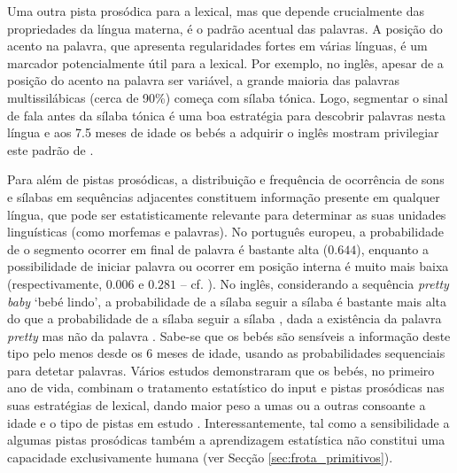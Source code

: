 \documentclass[output=paper]{LSP/langsci}
\begin{document}
Uma outra pista prosódica para a  lexical, mas que depende crucialmente das propriedades da língua materna, é o padrão acentual das palavras. A posição do acento na palavra, que apresenta regularidades fortes em várias línguas, é um marcador potencialmente útil para a  lexical. Por exemplo, no inglês, apesar de a posição do acento na palavra ser variável, a grande maioria das palavras multissilábicas (cerca de 90\%) começa com sílaba tónica. Logo, segmentar o sinal de fala antes da sílaba tónica é uma boa estratégia para descobrir palavras nesta língua e aos 7.5 meses de idade os bebés a adquirir o inglês mostram privilegiar este padrão de  \citep{jusczyk_etal1999}.

Para além de pistas prosódicas, a distribuição e frequência de ocorrência de sons e sílabas em sequências adjacentes constituem informação presente em qualquer língua, que pode ser estatisticamente relevante para determinar as suas unidades linguísticas (como morfemas e palavras). No português europeu, a probabilidade de o segmento \textipa{[S]} ocorrer em final de palavra é bastante alta ($0.644$), enquanto a possibilidade de \textipa{[S]} iniciar palavra ou ocorrer em posição interna é muito mais baixa (respectivamente, $0.006$ e $0.281$ -- cf. \citealt{vigario_etal2012}). No inglês, considerando a sequência \textit{pretty baby}  `bebé lindo', a probabilidade de a sílaba \textipa{[tI]} seguir a sílaba  é bastante mais alta do que a probabilidade de a sílaba  seguir a sílaba , dada a existência da palavra \textit{pretty} mas não da palavra . Sabe-se que os bebés são sensíveis a informação deste tipo pelo menos desde os 6 meses de idade, usando as probabilidades sequenciais para detetar palavras. Vários estudos demonstraram que os bebés, no primeiro ano de vida, combinam o tratamento estatístico do input e pistas prosódicas nas suas estratégias de  lexical, dando maior peso a umas ou a outras consoante a idade e o tipo de pistas em estudo \citep{kuhl2004,gerkenaslin2005,shukla_etal2011}. Interessantemente, tal como a sensibilidade a algumas pistas prosódicas também a aprendizagem estatística não constitui uma capacidade exclusivamente humana (ver Secção \ref{sec:frota_primitivos}).
\end{document}
